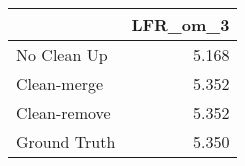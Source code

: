 \begin{tabular}{lr}
\toprule
{} & LFR_om_3 \\
\midrule
No Clean Up  &    5.168 \\
Clean-merge  &    5.352 \\
Clean-remove &    5.352 \\
Ground Truth &    5.350 \\
\bottomrule
\end{tabular}
